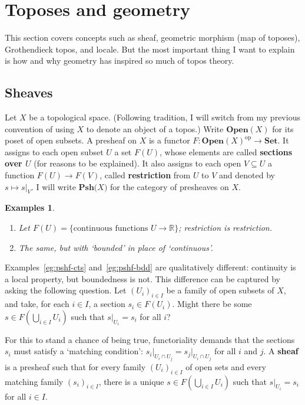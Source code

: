 \documentclass{article}
\newcommand{\fcat}[1]{\mathbf{#1}}
\newcommand{\op}{\mathrm{op}}
\newcommand{\Set}{\fcat{Set}}
\newcommand{\reals}{\mathbb{R}}
\newcommand{\demph}[1]{\textbf{\textup{#1}}}
\newcommand{\sub}{\subseteq}
\newcommand{\chunk}[1]{\subsection*{#1}}
\newcommand{\Pshf}[1]{\fcat{Psh}{#1}}
\newcommand{\Open}{\fcat{Open}}
\newcommand{\restr}[1]{\vert_{#1}}
\newcommand{\cln}{\colon}
\newtheorem{preexamples}[thm]{Examples}
\newenvironment{examples}{\begin{preexamples}\upshape}{\end{preexamples}}
\begin{document}
\section{Toposes and geometry}
\label{sec:geom}



This section covers concepts such as sheaf, geometric morphism (map of
toposes), Grothendieck topos, and locale.  But the most important thing I
want to explain is how and why geometry has inspired so much of topos theory.

\chunk{Sheaves}

Let $X$ be a topological space.  (Following tradition, I will switch from my
previous convention of using $X$ to denote an object of a topos.)  Write
$\Open(X)$ for its poset of open subsets.  A presheaf on $X$ is a functor
$F\cln \Open(X)^\op \to \Set$.  It assigns to each open subset $U$ a set
$F(U)$, whose elements are called \demph{sections over $U$} (for reasons to be
explained).  It also assigns to each open $V \sub U$ a function $F(U) \to
F(V)$, called \demph{restriction} from $U$ to $V$ and denoted by $s \mapsto
s\restr{V}$.  I will write $\Pshf(X)$ for the category of presheaves on $X$.

\begin{examples}
\begin{enumerate}
\item   \label{eg:pshf-cts}
Let $F(U) = \{\text{continuous functions } U \to \reals\}$; restriction
is restriction.
\item   \label{eg:pshf-bdd}
The same, but with `bounded' in place of `continuous'.
\end{enumerate}
\end{examples}

Examples~\eqref{eg:pshf-cts} and~\eqref{eg:pshf-bdd} are qualitatively
different: continuity is a local property, but boundedness is not.  This
difference can be captured by asking the following question.  Let $(U_i)_{i
\in I}$ be a family of open subsets of $X$, and take, for each $i \in I$, a
section $s_i \in F(U_i)$.  Might there be some $s \in F(\bigcup_{i \in I}
U_i)$ such that $s\restr{U_i} = s_i$ for all $i$?

For this to stand a chance of being true, functoriality demands that the
sections $s_i$ must satisfy a `matching condition': $s_i\restr{U_i \cap U_j} =
s_j\restr{U_i \cap U_j}$ for all $i$ and $j$.  A \demph{sheaf} is a presheaf
such that for every family $(U_i)_{i \in I}$ of open sets and every matching
family $(s_i)_{i \in I}$, there is a unique $s \in F(\bigcup_{i \in I} U_i)$
such that $s\restr{U_i} = s_i$ for all $i \in I$.
\end{document}
